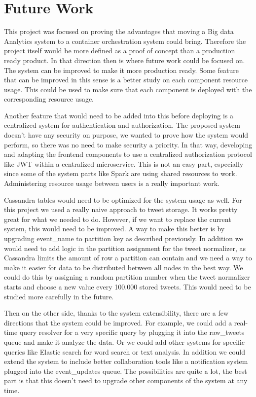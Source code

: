 
\chapter{Future Work} %

\label{Chapter7} %

This project was focused on proving the advantages that moving a Big data Analytics system to a container orchestration system could bring. Therefore the project itself would be more defined as a proof of concept than a production ready product. In that direction then is where future work could be focused on. The system can be improved to make it more production ready. Some feature that can be improved in this sense is a better study on each component resource usage. This could be used to make sure that each component is deployed with the corresponding resource usage. 

Another feature that would need to be added into this before deploying is a centralized system for authentication and authorization. The proposed system doesn’t have any security on purpose, we wanted to prove how the system would perform, so there was no need to make security a priority. In that way, developing and adapting the frontend components to use a centralized authorization protocol like JWT within a centralized microservice. This is not an easy part, especially since some of the system parts like Spark are using shared resources to work. Administering resource usage between users is a really important work.

Cassandra tables would need to be optimized for the system usage as well. For this project we used a really naive approach to tweet storage. It works pretty great for what we needed to do. However, if we want to replace the current system, this would need to be improved. A way to make this better is by upgrading event\_name to partition key as described previously. In addition we would need to add logic in the partition assignment for the tweet normalizer, as Cassandra limits the amount of row a partition can contain and we need a way to make it easier for data to be distributed between all nodes in the best way. We could do this by assigning a random partition number when the tweet normalizer starts and choose a new value every 100.000 stored tweets. This would need to be studied more carefully in the future.

Then on the other side, thanks to the system extensibility, there are a few directions that the system could be improved. For example, we could add a real-time query resolver for a very specific query by plugging it into the raw\_tweets queue and make it analyze the data. Or we could add other systems for specific queries like Elastic search for word search or text analysis. In addition we could extend the system to include better collaboration tools like a notification system plugged into the event\_updates queue. The possibilities are quite a lot, the best part is that this doesn’t need to upgrade other components of the system at any time.
